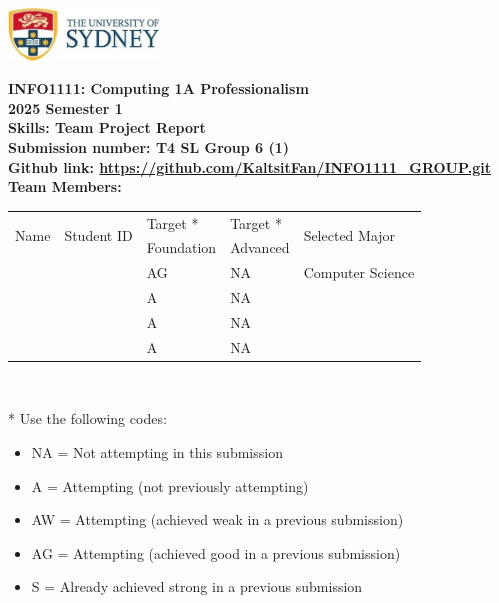 \documentclass[a4paper, 11pt]{report}
\begin{document}
\begin{titlepage}
\begin{flushright}
\includegraphics[width=4cm]{USyd}\\[1cm] 
\end{flushright}

\begin{centering}
\textbf{\huge INFO1111: Computing 1A Professionalism}\\[0.75cm]
\textbf{\huge 2025 Semester 1}\\[2cm]
\textbf{\huge Skills: Team Project Report}\\[2cm]

\textbf{\large Submission number: T4 SL Group 6 (1)}\\[0.5cm]
{\large \textbf{Github link: \url{https://github.com/KaltsitFan/INFO1111_GROUP.git}}}\\[0.75cm]
\textbf{\huge Team Members:}\\[0.75cm]

\begin{tabular}{|p{}|p{}|p{}|p{}|p{}|}
	\hline
	\multirow{2}{*}{Name} & \multirow{2}{*}{Student ID} & Target * & Target * & \multirow{2}{*}{Selected Major} \\
	 & & Foundation & Advanced & \\
	\hline
	\hline
	\raggedright{\studA} & \sidA & AG & NA & Computer Science \\
	\hline
	\raggedright{\studB} & \sidB & A & NA & \majB \\
	\hline
	\raggedright{\studC} & \sidC & A & NA & \majC \\
	\hline
	\raggedright{\studD} & \sidD & A & NA & \majD \\
	\hline
\end{tabular}
\\[0.5cm]
\end{centering}

* Use the following codes:
\begin{itemize}
\setlength\itemsep{0em}
\item NA = Not attempting in this submission
\item A = Attempting (not previously attempting)
\item AW = Attempting (achieved weak in a previous submission) 
\item AG = Attempting (achieved good in a previous submission)
\item S = Already achieved strong in a previous submission
\end{itemize}

\thispagestyle{empty}
\end{titlepage}
\end{document}
